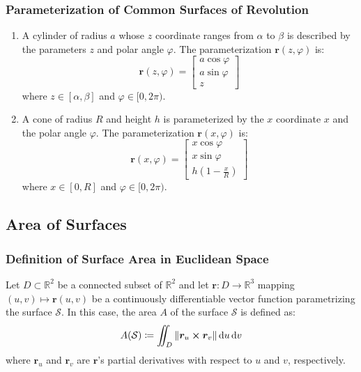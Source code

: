 \documentclass[11pt, a4paper]{article}
\newcommand{\diff}{\mathop{}\!\mathrm{d}} %
\begin{document}
\subsubsection{Parameterization of Common Surfaces of Revolution}
\begin{enumerate}
	\item A cylinder of radius $ a $ whose $ z $ coordinate ranges from $ \alpha $ to $ \beta $ is described by the parameters $ z $ and polar angle $ \varphi $. The parameterization $ \bm{r}(z, \varphi) $ is:
	\[\bm{r}(z, \varphi) = 
	\begin{bmatrix}
		a \cos \varphi \\
		a \sin \varphi \\
		z
	\end{bmatrix}
	\]
	where $ z \in [\alpha, \beta] $ and $ \varphi \in [0, 2\pi)$.
	
	\item A cone of radius $ R $ and height $ h $ is parameterized by the $ x $ coordinate $ x $ and the polar angle $ \varphi $. The parameterization $ \bm{r}(x, \varphi) $ is:
	\[\bm{r}(x, \varphi) = 
	\begin{bmatrix}
		x \cos \varphi \\[1.0ex]
		x \sin \varphi \\[1.0ex]
		h\left(1 - \frac{x}{R}\right)
	\end{bmatrix}
	\]
	where $ x \in [0, R] $ and $ \varphi \in [0, 2\pi)$.
\end{enumerate}

\subsection{Area of Surfaces}

\subsubsection{Definition of Surface Area in Euclidean Space}
Let $ D \subset \mathbb{R}^2 $ be a connected subset of $ \mathbb{R}^2 $ and let $ \bm{r} : D \rightarrow \mathbb{R}^3 $ mapping $ (u, v) \mapsto \bm{r}(u, v) $ be a continuously differentiable vector function parametrizing the surface $ \mathcal{S} $. In this case, the area $ A $ of the surface $ \mathcal{S} $ is defined as:
\begin{equation*}
	A(\mathcal{S}) \coloneqq \iint_D \norm{\bm{r}_u \cross \bm{r}_v} \diff u \diff v
\end{equation*}
where $ \bm{r}_u $ and $ \bm{r}_v $ are $ \bm{r} $'s partial derivatives with respect to $ u $ and $ v $, respectively.
\end{document}
